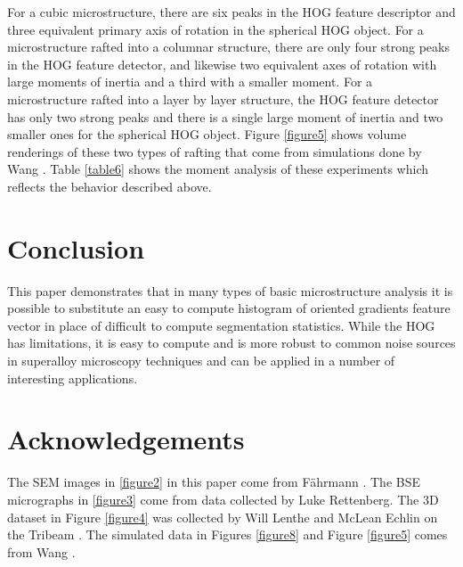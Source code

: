\documentclass[review]{elsarticle}
\begin{document}
	For a cubic microstructure, there are six peaks in the HOG feature descriptor and three equivalent primary axis of rotation in the spherical HOG object. For a microstructure rafted into a columnar structure, there are only four strong peaks in the HOG feature detector, and likewise two equivalent axes of rotation with large moments of inertia and a third with a smaller moment. For a microstructure rafted into a layer by layer structure, the HOG feature detector has only two strong peaks and there is a single large moment of inertia and two smaller ones for the spherical HOG object. Figure \ref{figure5} shows volume renderings of these two types of rafting that come from simulations done by Wang \cite{ywang2}. Table \ref{table6} shows the moment analysis of these experiments which reflects the behavior described above.
	
	\section{Conclusion}
	
	This paper demonstrates that in many types of basic microstructure analysis it is possible to substitute an easy to compute histogram of oriented gradients feature vector in place of difficult to compute segmentation statistics. While the HOG has limitations, it is easy to compute and is more robust to common noise sources in superalloy microscopy techniques and can be applied in a number of interesting applications.
	
	\section{Acknowledgements}
	
	The SEM images in \ref{figure2} in this paper come from F\"ahrmann \cite{faehrmann}. The BSE micrographs in \ref{figure3} come from data collected by Luke Rettenberg. The 3D dataset in Figure \ref{figure4} was collected by Will Lenthe and McLean Echlin on the Tribeam \cite{tribeam}. The simulated data in Figures \ref{figure8} and Figure \ref{figure5} comes from Wang \cite{ywang2}.

	
\end{document}
